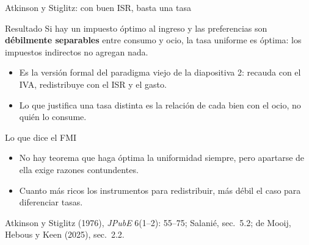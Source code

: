 \documentclass[aspectratio=169,11pt]{beamer}
\newcommand{\fuente}[1]{\par\vfill{\small\color{cGris}#1\par}}
\begin{document}
\begin{frame}{Atkinson y Stiglitz: con buen ISR, basta una tasa}
  \begin{block}{Resultado}
    Si hay un impuesto óptimo al ingreso y las preferencias son \textbf{débilmente separables} entre consumo y ocio, la tasa uniforme es óptima: los impuestos indirectos no agregan nada.
  \end{block}
  \pause
  \begin{itemize}
    \item Es la versión formal del paradigma viejo de la diapositiva 2: recauda con el IVA, redistribuye con el ISR y el gasto.
    \item Lo que justifica una tasa distinta es la relación de cada bien con el ocio, no quién lo consume.
  \end{itemize}
  \pause
  \begin{block}{Lo que dice el FMI}
    \begin{itemize}
      \item No hay teorema que haga óptima la uniformidad siempre, pero apartarse de ella exige razones contundentes.
      \item Cuanto más ricos los instrumentos para redistribuir, más débil el caso para diferenciar tasas.
    \end{itemize}
  \end{block}
  \fuente{Atkinson y Stiglitz (1976), \emph{JPubE} 6(1--2): 55--75; Salanié, sec.~5.2; de Mooij, Hebous y Keen (2025), sec.~2.2.}
\end{frame}
\end{document}
